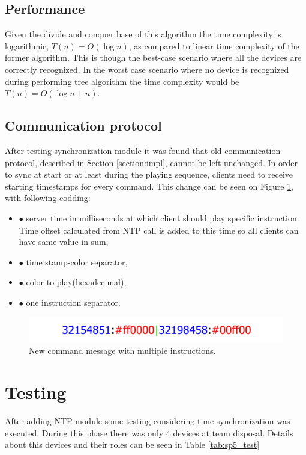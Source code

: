 \subsection{Performance}
Given the divide and conquer base of this algorithm the time complexity is logarithmic, $T(n) = O(\log n)$, as compared to linear time complexity of the former algorithm. This is though the best-case scenario where all the devices are correctly recognized. In the worst case scenario where no device is recognized during performing tree algorithm the time complexity would be $T(n) = O(\log n + n)$.

\subsection{Communication protocol} \label{sub:comm_protocol_new}
After testing synchronization module it was found that old communication protocol, described in Section \ref{section:impl}, cannot be left unchanged. In order to sync at start or at least during the playing sequence, clients need to receive starting timestamps for every command. This change can be seen on Figure \ref{fig:protocol_5}, with following codding:
\begin{itemize}
\item[] \textcolor{blue!100}{$\bullet$} server time in milliseconds at which client should play specific instruction. Time offset calculated from NTP call is added to this time so all clients can have same value in sum,
\item[] \textcolor{black!100}{$\bullet$} time stamp-color separator,
\item[] \textcolor{red!80}{$\bullet$} color to play(hexadecimal),
\item[] \textcolor{green!100}{$\bullet$} one instruction separator.
\end{itemize}

\begin{figure}[H]
	\centering
		\includegraphics[width=17cm]{sprint5/protocol_5.png}
	\caption{New command message with multiple instructions.}
	\label{fig:protocol_5}
\end{figure}

\section{Testing}
After adding NTP module some testing considering time synchronization was executed. During this phase there was only 4 devices at team disposal. Details about this devices and their roles can be seen in Table \ref{tab:sp5_test}

